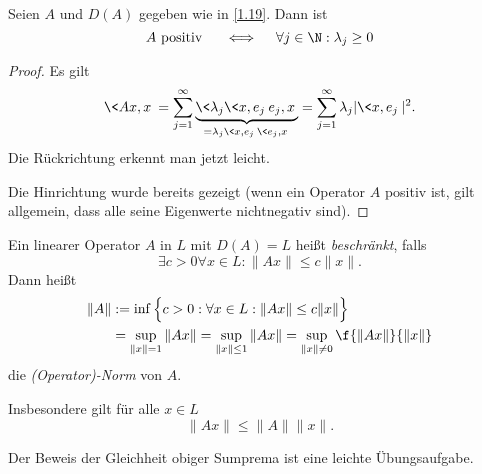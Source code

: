 \begin{nt} \label{1.22}
	Seien $A$ und $D(A)$ gegeben wie in \ref{1.19}.
	Dann ist
	\[
		A \text{ positiv }  \quad\iff\quad \forall j\in \N : \lambda_j \ge 0
	\]
	\begin{proof}
		Es gilt
		\begin{align*}
			\<Ax, x \>
			= \sum_{j=1}^\infty \underbrace{\<\lambda_j \<x,e_j\> e_j, x\>}_{= \lambda_j\<x,e_j\> \<e_j,x\>}
			= \sum_{j=1}^\infty \lambda_j |\<x,e_j\>|^2.
		\end{align*}
		Die Rückrichtung erkennt man jetzt leicht.

		Die Hinrichtung wurde bereits gezeigt (wenn ein Operator $A$ positiv ist, gilt allgemein, dass alle seine Eigenwerte nichtnegativ sind).
	\end{proof}
\end{nt}

\begin{df} \label{1.23}
	Ein linearer Operator $A$ in $L$ mit $D(A) = L$ heißt \emph{beschränkt}, falls
	\[
		\exists c > 0 \forall x \in L : \|Ax\| \le c\|x\|.
	\]
	Dann heißt
	\begin{align*}
		\|A\| &:= \inf \Big\{ c > 0 : \forall x \in L : \|Ax\| \le c\|x\| \Big\} \\
		&= \sup_{\|x\|=1} \|Ax\| = \sup_{\|x\|\le 1} \|Ax\| = \sup_{\|x\|\neq 0} \f{\|Ax\|}{\|x\|}
	\end{align*}
	die \emph{(Operator)-Norm} von $A$.

	Insbesondere gilt für alle $ x\in L $
	\[
		\|Ax\| \le \|A\| \|x\|.
	\]
	\begin{note}
		Der Beweis der Gleichheit obiger Sumprema ist eine leichte Übungsaufgabe.
	\end{note}
\end{df}

